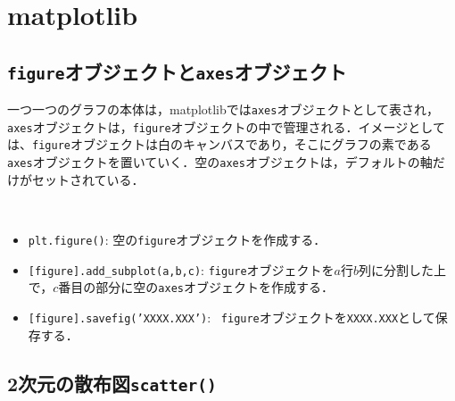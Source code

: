 \section{matplotlib}

\subsection{\texttt{figure}オブジェクトと\texttt{axes}オブジェクト}
一つ一つのグラフの本体は，matplotlibでは\texttt{axes}オブジェクトとして表され，\texttt{axes}オブジェクトは，\texttt{figure}オブジェクトの中で管理される．イメージとしては、\texttt{figure}オブジェクトは白のキャンバスであり，そこにグラフの素である\texttt{axes}オブジェクトを置いていく．空の\texttt{axes}オブジェクトは，デフォルトの軸だけがセットされている．

\begin{gram}　
\begin{itemize}
\item \texttt{plt.figure()}: 空の\texttt{figure}オブジェクトを作成する．
\item \texttt{[figure].add\_subplot(a,b,c)}: \texttt{figure}オブジェクトを$a$行$b$列に分割した上で，$c$番目の部分に空の\texttt{axes}オブジェクトを作成する．
\item \texttt{[figure].savefig('XXXX.XXX')}: ~\texttt{figure}オブジェクトを\texttt{XXXX.XXX}として保存する．
\end{itemize}
\end{gram}

\begin{cod}[\texttt{fig1.py}]　
}]{code/fig1.py}
\vspace{-19pt}
\begin{figure}[H]
\begin{center}
\framed
\texttt{[image: code/fig1.eps]}
\vspace{-16pt}
\caption{\texttt{fig1.eps}}
\endframed
\end{center}
\end{figure}
\end{cod}
\vspace{-20pt}

\subsection{2次元の散布図\texttt{scatter()}}

